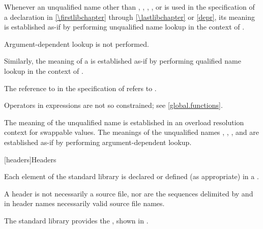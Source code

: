 \pnum
Whenever an unqualified name other than
, , ,
, or
is used in the specification of a declaration 
in \ref{\firstlibchapter} through \ref{\lastlibchapter} or \ref{depr},
its meaning is established
as-if by performing unqualified name lookup
in the context of .
\begin{note}
Argument-dependent lookup is not performed.
\end{note}
Similarly, the meaning of a  is established
as-if by performing qualified name lookup
in the context of .
\begin{example}
The reference to  in the specification of  refers to .
\end{example}
\begin{note}
Operators in expressions are not so constrained;
see \ref{global.functions}.
\end{note}
The meaning of the unqualified name  is established
in an overload resolution context
for swappable values.
The meanings of the unqualified names
, ,
, and
are established
as-if by performing argument-dependent lookup.


[headers]{Headers}

\pnum
Each element of the \Cpp{} standard library is declared or defined (as appropriate) in a
.
\begin{footnote}
A header is not necessarily a source file, nor are the
sequences delimited by \tcode{<} and \tcode{>} in header names necessarily valid source
file names.
\end{footnote}

\pnum
The \Cpp{} standard library provides the
,
shown in .

